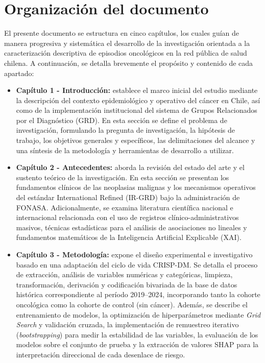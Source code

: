 \section{Organizaci\'on del documento}
\label{intro:organizacion}
El presente documento se estructura en cinco capítulos, los cuales guían de manera progresiva y sistemática el desarrollo de la investigación orientada a la caracterización descriptiva de episodios oncológicos en la red pública de salud chilena. A continuación, se detalla brevemente el propósito y contenido de cada apartado:

\begin{itemize}

\item \textbf{Capítulo 1 - Introducción:} establece el marco inicial del estudio mediante la descripción del contexto epidemiológico y operativo del cáncer en Chile, así como de la implementación institucional del sistema de Grupos Relacionados por el Diagnóstico (GRD). En esta sección se define el problema de investigación, formulando la pregunta de investigación, la hipótesis de trabajo, los objetivos generales y específicos, las delimitaciones del alcance y una síntesis de la metodología y herramientas de desarrollo a utilizar.

\item \textbf{Capítulo 2 - Antecedentes:} aborda la revisión del estado del arte y el sustento teórico de la investigación. En esta sección se presentan los fundamentos clínicos de las neoplasias malignas y los mecanismos operativos del estándar International Refined (IR-GRD) bajo la administración de FONASA. Adicionalmente, se examina literatura científica nacional e internacional relacionada con el uso de registros clínico-administrativos masivos, técnicas estadísticas para el análisis de asociaciones no lineales y fundamentos matemáticos de la Inteligencia Artificial Explicable (XAI).

\item \textbf{Capítulo 3 - Metodología:} expone el diseño experimental e investigativo basado en una adaptación del ciclo de vida CRISP-DM. Se detalla el proceso de extracción, análisis de variables numéricas y categóricas, limpieza, transformación, derivación y codificación bivariada de la base de datos histórica correspondiente al período 2019--2024, incorporando tanto la cohorte oncológica como la cohorte de control (sin cáncer). Además, se describe el entrenamiento de modelos, la optimización de hiperparámetros mediante \textit{Grid Search} y validación cruzada, la implementación de remuestreo iterativo (\textit{bootstrapping}) para medir la estabilidad de las variables, la evaluación de los modelos sobre el conjunto de prueba y la extracción de valores SHAP para la interpretación direccional de cada desenlace de riesgo.


\end{itemize}

